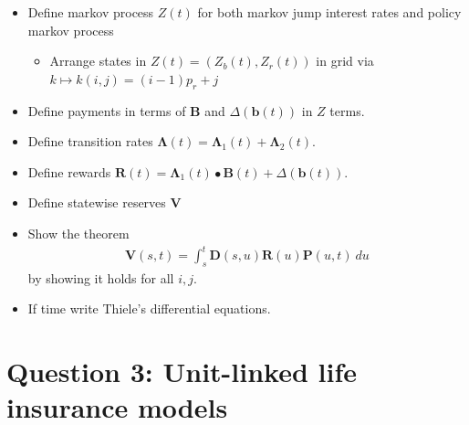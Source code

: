 \documentclass[
]{book}
\providecommand{\tightlist}{%
  \setlength{\itemsep}{0pt}\setlength{\parskip}{0pt}}
\begin{document}
\begin{itemize}
\tightlist
\item
  Define markov process \(Z(t)\) for both markov jump interest rates and policy markov process

  \begin{itemize}
  \tightlist
  \item
    Arrange states in \(Z(t)=(Z_b(t),Z_r(t))\) in grid via \(k\mapsto k(i,j) = (i-1)p_r+j\)
  \end{itemize}
\item
  Define payments in terms of \(\mathbf B\) and \(\Delta (\mathbf b(t))\) in \(Z\) terms.
\item
  Define transition rates \(\mathbf \Lambda(t)=\mathbf \Lambda_1(t)+\mathbf \Lambda_2(t)\).
\item
  Define rewards \(\mathbf R(t)=\mathbf \Lambda_1(t)\bullet \mathbf B(t)+\Delta(\mathbf b(t))\).
\item
  Define statewise reserves \(\mathbf V\)
\item
  Show the theorem
  \begin{align*}
    \mathbf V(s,t)=\int_s^t \mathbf D(s,u)\mathbf R(u)\mathbf P(u,t)\ du
    \end{align*}
  by showing it holds for all \(i,j\).
\item
  If time write Thiele's differential equations.
\end{itemize}

\newpage

\hypertarget{question-3-unit-linked-life-insurance-models}{%
\section{Question 3: Unit-linked life insurance models}\label{question-3-unit-linked-life-insurance-models}}
\end{document}
